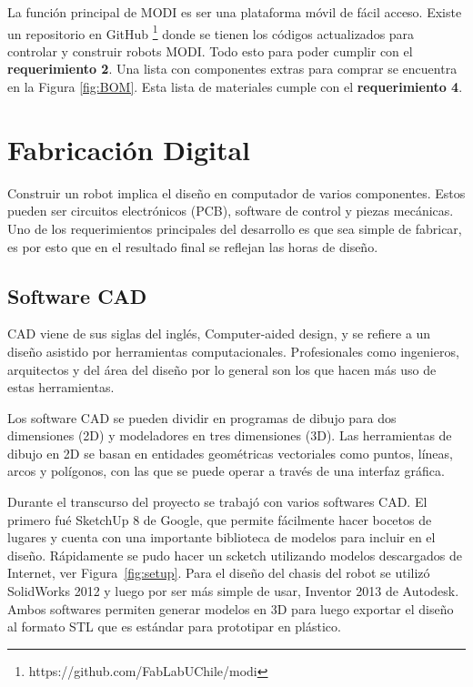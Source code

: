 La función principal de MODI es ser una plataforma móvil de fácil acceso. Existe un repositorio en GitHub  \footnote{https://github.com/FabLabUChile/modi} donde se tienen los códigos actualizados para controlar y construir robots MODI. Todo esto para poder cumplir con el \textbf{requerimiento 2}. Una lista con componentes extras para comprar se encuentra en la Figura \ref{fig:BOM}. Esta lista de materiales cumple con el \textbf{requerimiento 4}.


\section{Fabricación Digital}

Construir un robot implica el diseño en computador de varios componentes. Estos pueden ser circuitos electrónicos (PCB), software de control y piezas mecánicas. Uno de los requerimientos principales del desarrollo es que sea simple de fabricar, es por esto que en el resultado final se reflejan las horas de diseño.




\subsection{Software CAD}

CAD viene de sus siglas del inglés, Computer-aided design, y se refiere a un diseño asistido por herramientas computacionales. Profesionales como ingenieros, arquitectos y del área del diseño por lo general son los que hacen más uso de estas herramientas.

Los software CAD se pueden dividir en programas de dibujo para dos dimensiones (2D) y modeladores en tres dimensiones (3D). Las herramientas de dibujo en 2D se basan en entidades geométricas vectoriales como puntos, líneas, arcos y polígonos, con las que se puede operar a través de una interfaz gráfica.

Durante el transcurso del proyecto se trabajó con varios softwares CAD. El primero fué SketchUp 8 de Google, que permite fácilmente hacer bocetos de lugares y cuenta con una importante biblioteca de modelos para incluir en el diseño. Rápidamente se pudo hacer un scketch utilizando modelos descargados de Internet, ver Figura~\ref{fig:setup}. Para el diseño del chasis del robot se utilizó SolidWorks 2012 y luego por ser más simple de usar, Inventor 2013 de Autodesk. Ambos softwares permiten generar modelos en 3D para luego exportar el diseño al formato STL que es estándar para prototipar en plástico. 




